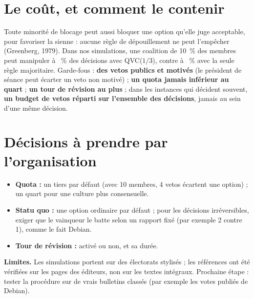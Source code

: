 \documentclass[10pt,a4paper]{article}
\begin{document}
\section{Le coût, et comment le contenir}
Toute minorité de blocage peut aussi bloquer une option qu'elle juge acceptable, pour favoriser la
sienne : aucune règle de dépouillement ne peut l'empêcher (Greenberg, 1979). Dans nos simulations, une
coalition de 10~\% des membres peut manipuler \KNmanipQVCSpatial{} à \KNmanipQVCPolarised~\% des
décisions avec QVC($1/3$), contre \KNmanipSchulzeSpatial{} à \KNmanipSchulzePolarised~\% avec la seule
règle majoritaire. Garde-fous : \textbf{des vetos publics et motivés} (le président de séance peut écarter
un veto non motivé) ; \textbf{un quota jamais inférieur au quart} ; \textbf{un tour de révision au plus} ;
dans les instances qui décident souvent, \textbf{un budget de vetos réparti sur l'ensemble des
décisions}, jamais au sein d'une même décision.

\section{Décisions à prendre par l'organisation}
\begin{itemize}
  \item \textbf{Quota :} un tiers par défaut (avec 10 membres, 4 vetos écartent une option) ; un quart
  pour une culture plus consensuelle.
  \item \textbf{Statu quo :} une option ordinaire par défaut ; pour les décisions irréversibles, exiger
  que le vainqueur le batte selon un rapport fixé (par exemple 2 contre 1), comme le fait Debian.
  \item \textbf{Tour de révision :} activé ou non, et sa durée.
\end{itemize}

{\footnotesize\color{muted}\textbf{Limites.} Les simulations portent sur des électorats stylisés ; les
références ont été vérifiées sur les pages des éditeurs, non sur les textes intégraux. Prochaine étape :
tester la procédure sur de vrais bulletins classés (par exemple les votes publiés de Debian).\par}
\end{document}
